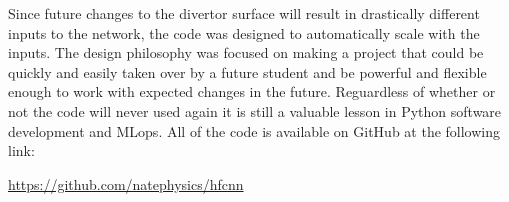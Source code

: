 Since future changes to the divertor surface will result in drastically different inputs to the network, the code was designed to automatically scale with the inputs. The design philosophy was focused on making a project that could be quickly and easily taken over by a future student and be powerful and flexible enough to work with expected changes in the future. Reguardless of whether or not the code will never used again it is still a valuable lesson in Python software development and MLops. All of the code is available on GitHub at the following link:

\url{https://github.com/natephysics/hfcnn}